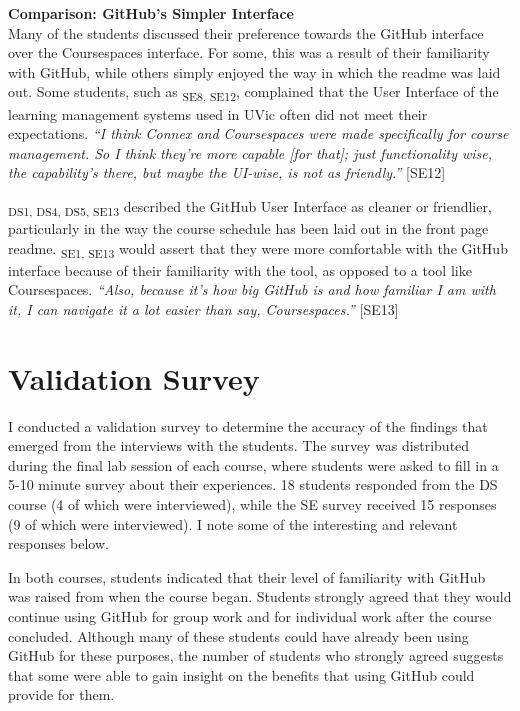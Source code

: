 \textbf{Comparison: GitHub's Simpler Interface} \\
Many of the students discussed their preference towards the  GitHub interface over the Coursespaces interface. For some, this was a result of their familiarity with GitHub, while others simply enjoyed the way in which the readme was laid out. Some students, such as \textsubscript{SE8, SE12}, complained that the User Interface of the learning management systems used in UVic often did not meet their expectations. \textit{``I think Connex and Coursespaces were made specifically for course management. So I think they're more capable [for that]; just functionality wise, the capability's there, but maybe the UI-wise, is not as friendly.''} [SE12]

\textsubscript{DS1, DS4, DS5, SE13} described the GitHub User Interface as cleaner or friendlier, particularly in the way the course schedule has been laid out in the front page readme. \textsubscript{SE1, SE13} would assert that they were more comfortable with the GitHub interface because of their familiarity with the tool, as opposed to a tool like Coursespaces. \textit{``Also, because it's how big GitHub is and how familiar I am with it, I can navigate it a lot easier than say, Coursespaces.''} [SE13]


\section{Validation Survey}
I conducted a validation survey to determine the accuracy of the findings that emerged from the interviews with the students. The survey was distributed during the final lab session of each course, where students were asked to fill in a 5-10 minute survey about their experiences. 18 students responded from the DS course (4 of which were interviewed), while the SE survey received 15 responses (9 of which were interviewed). I note some of the interesting and relevant responses below.

In both courses, students indicated that their level of familiarity with GitHub was raised from when the course began. Students strongly agreed that they would continue using GitHub for group work and for individual work after the course concluded. Although many of these students could have already been using GitHub for these purposes, the number of students who strongly agreed suggests that some were able to gain insight on the benefits that using GitHub could provide for them.

